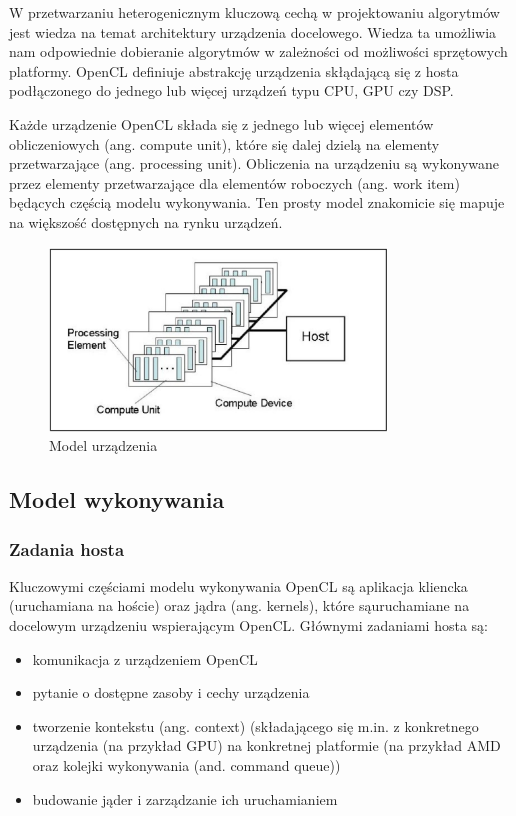 \documentclass[polish, 12pt]{aghthesis}
\begin{document}
	W przetwarzaniu heterogenicznym kluczową cechą w projektowaniu algorytmów jest wiedza na temat architektury urządzenia docelowego. Wiedza ta umożliwia nam odpowiednie dobieranie algorytmów w zależności od możliwości sprzętowych platformy. OpenCL definiuje abstrakcję urządzenia skłądającą się z hosta podłączonego do jednego lub więcej urządzeń typu CPU, GPU czy DSP.
	
	Każde urządzenie OpenCL składa się z jednego lub więcej elementów obliczeniowych (ang. compute unit), które się dalej dzielą na elementy przetwarzające (ang. processing unit). Obliczenia na urządzeniu są wykonywane przez elementy przetwarzające dla elementów roboczych (ang. work item) będących częścią modelu wykonywania. Ten prosty model znakomicie się mapuje na większość dostępnych na rynku urządzeń.
	
	
	\begin{figure}[h!]
    \centering
    \includegraphics[width=0.8\textwidth]{PlatformModel.jpg}
    \caption{Model urządzenia}
    \label{fig:awesome_image}
	\end{figure}
	
	\subsection{Model wykonywania}
	
	\subsubsection{Zadania hosta}
	Kluczowymi częściami modelu wykonywania OpenCL są aplikacja kliencka (uruchamiana na hoście) oraz jądra (ang. kernels), które sąuruchamiane na docelowym urządzeniu wspierającym OpenCL. Głównymi zadaniami hosta są:
	\begin{itemize} 
	\item komunikacja z urządzeniem OpenCL
	\item pytanie o dostępne zasoby i cechy urządzenia
	\item tworzenie kontekstu (ang. context) (składającego się m.in. z konkretnego urządzenia (na przykład GPU) na konkretnej platformie (na przykład AMD oraz kolejki wykonywania (and. command queue))
	\item budowanie jąder i zarządzanie ich uruchamianiem
	\end{itemize}
	
\end{document}
